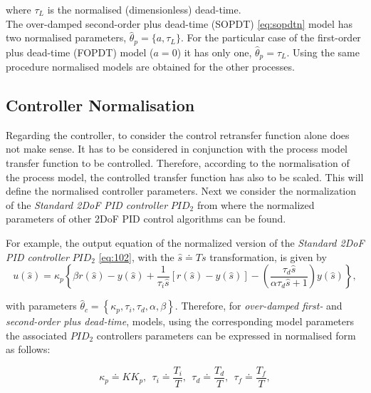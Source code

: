 \noindent where $\tau_L$ is the normalised (dimensionless) dead-time.\\

The over-damped second-order plus dead-time (SOPDT) \eqref{eq:sopdtn} model has two normalised parameters, $\hat{\theta}_p = \{a, \tau_L\}$.  For the particular case of the first-order plus dead-time (FOPDT) model ($a=0$) it has only one, $\hat{\theta}_p = \tau_L$. Using the same procedure normalised models are obtained for the other processes.\\


\subsection{Controller Normalisation}
\label{sec:3.3}

Regarding the controller, to consider the control retransfer function alone does not make sense. It has to be considered in conjunction with the process model transfer function to be controlled. Therefore, according to the normalisation of the process model, the controlled transfer function has also to be scaled. This will define the normalised controller parameters. Next we consider the normalization of the \emph{Standard 2DoF PID controller} $PID_2$ from where the normalized parameters of other 2DoF PID control algorithms can be found.

For example, the output equation of the normalized version of the \emph{Standard 2DoF PID controller} $PID_2$ \eqref{eq:102}, with the $\hat s \doteq T s$ transformation, is given by
\begin{equation}
	u(\hat s) = \kappa_p \left\{\beta r(\hat s)-y(\hat s) + \frac{1}{\tau_i \hat s} \left[r(\hat s)-y(\hat s)\right] - \left(\frac{\tau_d \hat s}{\alpha \tau_d \hat s+1}\right) y(\hat s)\right\},
\end{equation}

\noindent with parameters $\hat{\theta}_c = \left\{\kappa_p, \tau_i, \tau_d, \alpha, \beta \right\}$. Therefore,  for \emph{over-damped first-} and \emph{second-order plus dead-time},  models, using the corresponding model parameters the associated $PID_2$ controllers parameters can be expressed in normalised form as follows:

\begin{equation}
	\kappa_p \doteq K K_p, \ \ \tau_i \doteq \frac{T_i}{T}, \ \ \tau_d \doteq \frac{T_d}{T}, \ \ \tau_f \doteq \frac{T_f}{T}, \label{eq:npara}
\end{equation}


